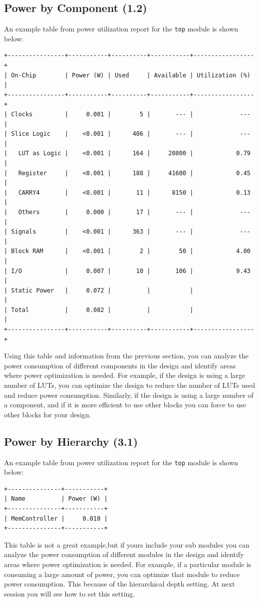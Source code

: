 \documentclass{report}
\begin{document}
\subsection{Power by Component (1.2)}
An example table from power utilization report for the \texttt{top} module is shown below:
\begin{verbatim}
+----------------+-----------+----------+-----------+-----------------+
| On-Chip        | Power (W) | Used     | Available | Utilization (%) |
+----------------+-----------+----------+-----------+-----------------+
| Clocks         |     0.001 |        5 |       --- |             --- |
| Slice Logic    |    <0.001 |      406 |       --- |             --- |
|   LUT as Logic |    <0.001 |      164 |     20800 |            0.79 |
|   Register     |    <0.001 |      188 |     41600 |            0.45 |
|   CARRY4       |    <0.001 |       11 |      8150 |            0.13 |
|   Others       |     0.000 |       17 |       --- |             --- |
| Signals        |    <0.001 |      363 |       --- |             --- |
| Block RAM      |    <0.001 |        2 |        50 |            4.00 |
| I/O            |     0.007 |       10 |       106 |            9.43 |
| Static Power   |     0.072 |          |           |                 |
| Total          |     0.082 |          |           |                 |
+----------------+-----------+----------+-----------+-----------------+
\end{verbatim}
Using this table and information from the previous section, you can analyze the power consumption of different components in the design and identify areas where power optimization is needed. For example, if the design is using a large number of LUTs, you can optimize the design to reduce the number of LUTs used and reduce power consumption. Similarly, if the design is using a large number of a component, and if it is more efficient to use other blocks you can force to use other blocks for your design.

\subsection{Power by Hierarchy (3.1)}
An example table from power utilization report for the \texttt{top} module is shown below:
\begin{verbatim}
+---------------+-----------+
| Name          | Power (W) |
+---------------+-----------+
| MemController |     0.010 |
+---------------+-----------+
\end{verbatim}
This table is not a great example,but if yours include your sub modules you can analyze the power consumption of different modules in the design and identify areas where power optimization is needed. For example, if a particular module is consuming a large amount of power, you can optimize that module to reduce power consumption. This because of the hierarchical depth setting. At next session you will see how to set this setting.
\end{document}
